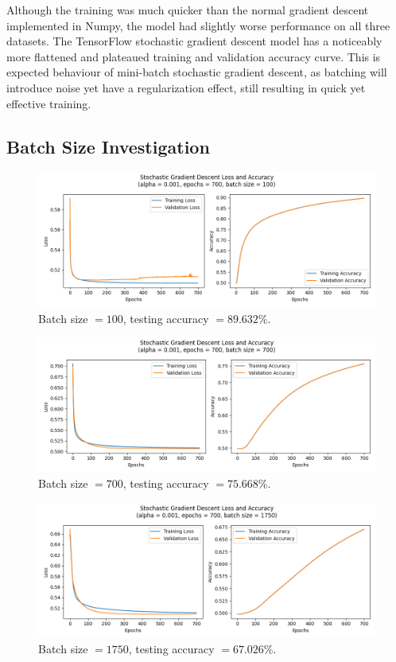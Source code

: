 \documentclass[letter]{article}
\begin{document}
Although the training was much quicker than the normal gradient descent implemented in Numpy, the model had slightly worse performance on all three datasets. The TensorFlow stochastic gradient descent model has a noticeably more flattened and plateaued training and validation accuracy curve. This is expected behaviour of mini-batch stochastic gradient descent, as batching will introduce noise yet have a regularization effect, still resulting in quick yet effective training. 

\subsection{Batch Size Investigation}

\begin{figure}[H]
	\centering
	\includegraphics[width=\linewidth]{Figure_8}
	\caption{Batch size $ = 100$, testing accuracy $ = 89.632\%$.}
	\label{fig:plot8}
\end{figure}

\begin{figure}[H]
	\centering
	\includegraphics[width=\linewidth]{Figure_9}
	\caption{Batch size $ = 700$, testing accuracy $ = 75.668\%$.}
	\label{fig:plot9}
\end{figure}

\begin{figure}[H]
	\centering
	\includegraphics[width=\linewidth]{Figure_10}
	\caption{Batch size $ = 1750$, testing accuracy $ = 67.026\%$.}
	\label{fig:plot10}
\end{figure}
\end{document}
